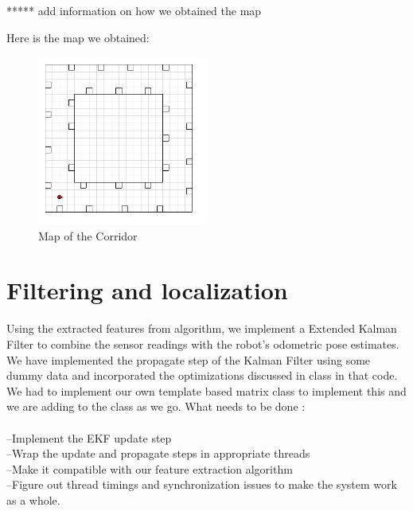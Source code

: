 \documentclass{article}
\begin{document}
***** add information on how we obtained the map

Here is the map we obtained:
\begin{figure}[htb] 
\centering
\includegraphics[width=0.5\textwidth]{map.png}
\caption {Map of the Corridor}
\end{figure}

\section{Filtering and localization}

Using the extracted features from algorithm, we implement a Extended Kalman Filter to combine the sensor readings with the robot's odometric pose estimates. We have implemented the propagate step of the Kalman Filter using some dummy data and incorporated the optimizations discussed in class in that code. We had to implement our own template based matrix class to implement this and we are adding to the class as we go. What needs to be done :\\ \\
--Implement the EKF update step\\
--Wrap the update and propagate steps in appropriate threads\\
--Make it compatible with our feature extraction algorithm\\
--Figure out thread timings and synchronization issues to make the system work as a whole.\\
\end{document}
